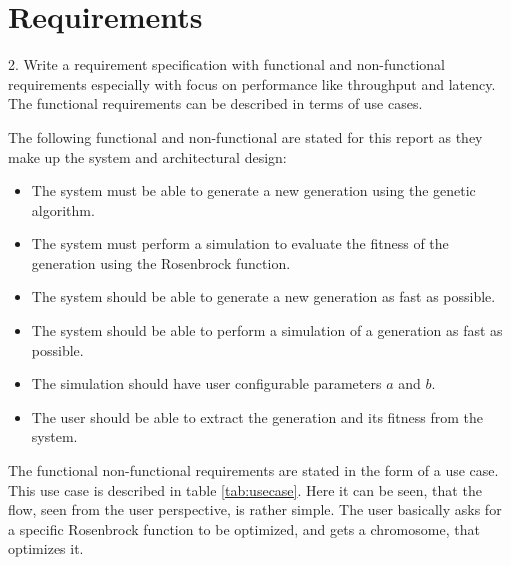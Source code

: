 \section{Requirements}\label{sec:req}

\begin{framed}
2. Write a requirement specification with functional and non-functional requirements especially with focus on performance like throughput and latency. The functional requirements can be described in terms of use cases.
\end{framed}

The following functional and non-functional are stated for this report as they make up the system and architectural design:

\begin{itemize}
\item The system must be able to generate a new generation using the genetic algorithm.
\item The system must perform a simulation to evaluate the fitness of the generation using the Rosenbrock function.
\item The system should be able to generate a new generation as fast as possible.
\item The system should be able to perform a simulation of a generation as fast as possible.
\item The simulation should have user configurable parameters $a$ and $b$.
\item The user should be able to extract the generation and its fitness from the system.
\end{itemize}

The functional non-functional requirements are stated in the form of a use case.
This use case is described in table \ref{tab:usecase}. Here it can be seen, that the flow, seen from the user perspective, is rather simple. The user basically asks for a specific Rosenbrock function to be optimized, and gets a chromosome, that optimizes it.

